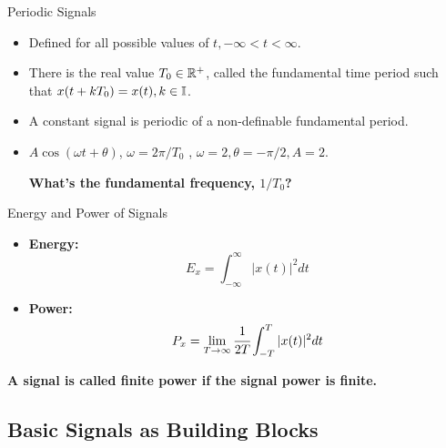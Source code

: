 \documentclass[aspectratio=169,xcolor=dvipsnames,svgnames,x11names,fleqn]{beamer}
\begin{document}
\begin{frame}{Periodic Signals}

\footnotesize

\begin{itemize}
    \item Defined for all possible values of $t, -\infty < t < \infty$.
    \item 
There is the real value $T_0 \in {\mathbb R}^+$, called the fundamental time period such that $x(  t + kT_0 ) = x(t), k \in {\mathbb I}$.

\item A constant signal is periodic of a non-definable fundamental period.
\item  $A\cos(\omega t + \theta)$, $\omega = 2\pi/T_0$ ,
$\omega = 2, \theta = -\pi/2, A= 2$.

\vspace{5pt}

\bf \color{red}
What’s the fundamental frequency, $1/T_0$?
\end{itemize}
\vfill

\end{frame}

\begin{frame}{Energy and Power of Signals}


    \begin{itemize}
        \item \textbf{Energy:}
        $$
        E_x = \int_{-\infty}^\infty | x(t)| ^2 dt
        $$

        \item \textbf{Power:}
        $$
        P_x = \lim_{T\to\infty}\cfrac{1}{2T} \int_{-T}^T | x(t)| ^2 dt
        $$
    \end{itemize}

    \bf A signal is called finite power if the signal power is finite.
\end{frame}


\subsection{Basic Signals as Building Blocks}


\begin{frame}
    \subsectionpage
\end{frame}
\end{document}
